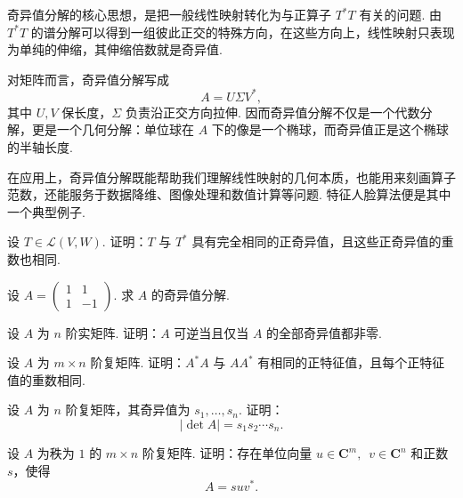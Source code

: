 \begin{summary}
    奇异值分解的核心思想，是把一般线性映射转化为与正算子 $T^*T$ 有关的问题. 由 $T^*T$ 的谱分解可以得到一组彼此正交的特殊方向，在这些方向上，线性映射只表现为单纯的伸缩，其伸缩倍数就是奇异值.

    对矩阵而言，奇异值分解写成
    \[
        A = U\Sigma V^*,
    \]
    其中 $U, V$ 保长度，$\Sigma$ 负责沿正交方向拉伸. 因而奇异值分解不仅是一个代数分解，更是一个几何分解：单位球在 $A$ 下的像是一个椭球，而奇异值正是这个椭球的半轴长度.

    在应用上，奇异值分解既能帮助我们理解线性映射的几何本质，也能用来刻画算子范数，还能服务于数据降维、图像处理和数值计算等问题. 特征人脸算法便是其中一个典型例子.
\end{summary}

\begin{exercise}

    \begin{exgroup}
        \item 设 $T \in \mathcal{L}(V, W)$. 证明：$T$ 与 $T^*$ 具有完全相同的正奇异值，且这些正奇异值的重数也相同.

        \item 设 $A = \begin{pmatrix}
            1 & 1 \\
            1 & -1
        \end{pmatrix}$. 求 $A$ 的奇异值分解.

        \item 设 $A$ 为 $n$ 阶实矩阵. 证明：$A$ 可逆当且仅当 $A$ 的全部奇异值都非零.
    \end{exgroup}

    \begin{exgroup}
        \item 设 $A$ 为 $m \times n$ 阶复矩阵. 证明：$A^*A$ 与 $AA^*$ 有相同的正特征值，且每个正特征值的重数相同.

        \item 设 $A$ 为 $n$ 阶复矩阵，其奇异值为 $s_1, \ldots, s_n$. 证明：
        \[
            |\det A| = s_1s_2\cdots s_n.
        \]

        \item 设 $A$ 为秩为 $1$ 的 $m \times n$ 阶复矩阵. 证明：存在单位向量 $u \in \mathbf{C}^m,\enspace v \in \mathbf{C}^n$ 和正数 $s$，使得
            \[
                A = suv^*.
            \]
    \end{exgroup}


\end{exercise}

